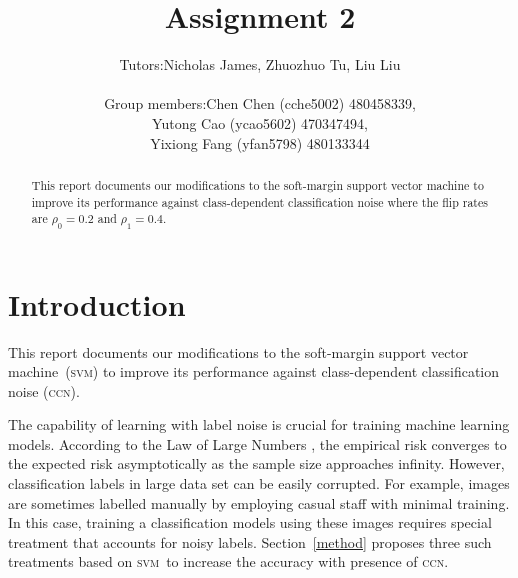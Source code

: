 \documentclass[12pt]{article} %
\title{Assignment 2}
\newcommand{\svm}{\textsc{svm}}
\begin{document}
\author{%
 \begin{tabular}{rl}
  Tutors:& Nicholas James, Zhuozhuo Tu, Liu Liu\\ \\
Group members: & Chen Chen (cche5002) 480458339,\\
& Yutong Cao (ycao5602) 470347494,\\
& Yixiong Fang (yfan5798) 480133344
\end{tabular}
}

\maketitle



\begin{abstract}
This report documents our modifications to the soft-margin support vector machine to improve its performance against class-dependent classification noise where the flip rates are $\rho_0=0.2$ and $\rho_1=0.4$.
\end{abstract}
\tableofcontents
\section{Introduction}
This report documents our modifications to the soft-margin support vector machine~(\svm) to improve its performance against class-dependent classification noise (\textsc{ccn}).

The capability of learning with label noise is crucial for training machine learning models. According to the Law of Large Numbers \citep{hardle2007applied}, the empirical risk converges to the expected risk asymptotically as the sample size approaches infinity. However, classification labels in large data set can be easily corrupted. For example, images  are sometimes labelled manually by employing casual staff with minimal training. In this case, training a classification models using these images requires special treatment that accounts for noisy labels. Section~\ref{method} proposes three such treatments based on \svm\ to increase the accuracy with presence of \textsc{ccn}.

\end{document}
